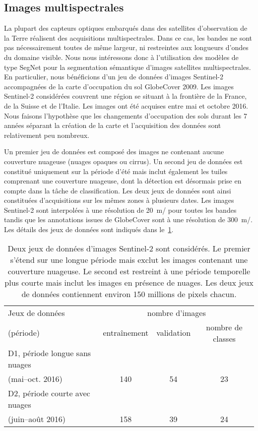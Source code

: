 \subsection{Images multispectrales}

La plupart des capteurs optiques embarqués dans des satellites d'observation de la Terre réalisent des acquisitions multispectrales. Dans ce cas, les bandes ne sont pas nécessairement toutes de même largeur, ni restreintes aux longueurs d'ondes du domaine visible. Nous nous intéressons donc à l'utilisation des modèles de type SegNet pour la segmentation sémantique d'images satellites multispectrales.
En particulier, nous bénéficions d'un jeu de données d'images Sentinel-2 accompagnées de la carte d'occupation du sol GlobeCover 2009. Les images Sentinel-2 considérées couvrent une région se situant à la frontière de la France, de la Suisse et de l'Italie. Les images ont été acquises entre mai et octobre 2016. Nous faisons l'hypothèse que les changements d'occupation des sols durant les 7 années séparant la création de la carte et l'acquisition des données sont relativement peu nombreux.

Un premier jeu de données est composé des images ne contenant aucune couverture nuageuse (nuages opaques ou cirrus). Un second jeu de données est constitué uniquement sur la période d'été mais inclut également les tuiles comprenant une couverture nuageuse, dont la détection est désormais prise en compte dans la tâche de classification. Les deux jeux de données sont ainsi constituées d'acquisitions sur les mêmes zones à plusieurs dates. Les images Sentinel-2 sont interpolées à une résolution de \SI{20}{\meter/\px} pour toutes les bandes tandis que les annotations issues de GlobeCover sont à une résolution de \SI{300}{\meter/\px}. Les détails des jeux de données sont indiqués dans le~\cref{tab:datasets}.

\begin{table}
\caption{Deux jeux de données d'images Sentinel-2 sont considérés. Le premier s'étend sur une longue période mais exclut les images contenant une couverture nuageuse. Le second est restreint à une période temporelle plus courte mais inclut les images en présence de nuages. Les deux jeux de données contiennent environ 150 millions de pixels chacun.}
\label{tab:datasets}
\begin{tabular}{lccc}
\toprule
Jeux de données & \multicolumn{3}{c}{nombre d'images}\\
(période)  & entraînement & validation  & nombre de classes \\
\midrule
D1, période longue sans nuages & & & \\
 (mai--oct. 2016) & 140 & 54 & 23 \\
\midrule
D2, période courte avec nuages & & & \\
(juin--août 2016) & 158 & 39 & 24 \\
\bottomrule
\end{tabular}
\end{table}

